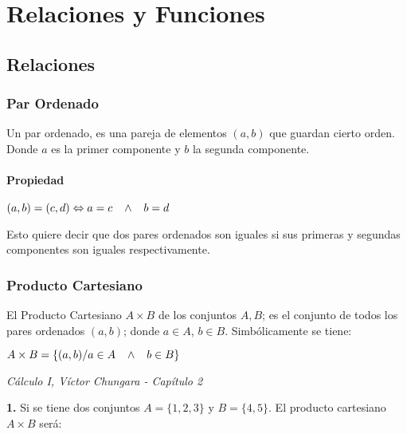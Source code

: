 \documentclass[12pt,a4paper]{book}
\newcommand*\ruleline[1]{\par\noindent\raisebox{.8ex}{\makebox[\linewidth]{\hrulefill\hspace{1ex}\raisebox{-.8ex}{#1}\hspace{1ex}\hrulefill}}}
\begin{document}
{{\chapter{Relaciones y Funciones}
\section{Relaciones}
\subsection{Par Ordenado}
\begin{framed}\noindent
Un par ordenado, es una pareja de elementos $(a,b)$ que guardan cierto orden. Donde $a$ es la primer componente y $b$ la segunda componente.
\end{framed}
\subsubsection{Propiedad}
\begin{center}
$(a,b) = (c,d) \Leftrightarrow a=c \hspace{0.3cm}\wedge \hspace{0.3cm} b=d$ 
\end{center}
Esto quiere decir que dos pares ordenados son iguales si sus primeras y segundas componentes son iguales respectivamente.
\subsection{Producto Cartesiano}

\begin{framed}\noindent
El Producto Cartesiano $A \times B$ de los conjuntos $A,B$; es el conjunto de todos los pares ordenados $(a,b)$; donde $a \in A$, $b \in B$. Simbólicamente se tiene:
\begin{center}
$A \times B = \lbrace (a,b)/ a\in A \hspace{0.3cm} \wedge \hspace{0.3cm} b \in B \rbrace$
\end{center}
\begin{flushright}
\textit{{\scriptsize Cálculo I, Víctor Chungara - Capítulo 2}}
\end{flushright}
\vspace{-0.5cm}
\end{framed}
\ruleline{\textbf{Ejemplos}}
\textbf{1.} Si se tiene dos conjuntos $A=\lbrace 1,2,3 \rbrace$ y $B = \lbrace 4,5 \rbrace$. El producto cartesiano $A \times B$ será:

}}
\end{document}
